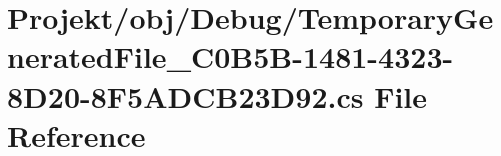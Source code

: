 \hypertarget{_temporary_generated_file__036_c0_b5_b-1481-4323-8_d20-8_f5_a_d_c_b23_d92_8cs}{}\section{Projekt/obj/\+Debug/\+Temporary\+Generated\+File\+\_\+C0\+B5\+B-\/1481-\/4323-\/8\+D20-\/8\+F5\+A\+D\+C\+B23\+D92.cs File Reference}
\label{_temporary_generated_file__036_c0_b5_b-1481-4323-8_d20-8_f5_a_d_c_b23_d92_8cs}
